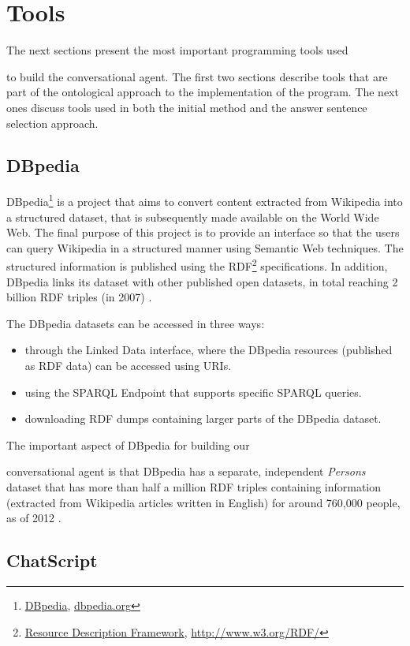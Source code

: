 \chapter{Tools}
\label{chapter:tools}

The next sections present the most important programming tools used  to build the conversational agent. The first two sections describe tools that are part of the ontological approach to the implementation of the program. The next ones discuss tools used in both the initial method and the answer sentence selection approach.

\section[DBpedia]{DBpedia}
\label{sec:dbpedia}

DBpedia\footnote{\href{dbpedia.org}{DBpedia}, \url{dbpedia.org}} is a project that aims to convert content extracted from Wikipedia into a structured dataset, that is subsequently made available on the World Wide Web. The final purpose of this project is to provide an interface so that the users can query Wikipedia in a structured manner using Semantic Web techniques. The structured information is published using the RDF\footnote{\href{http://www.w3.org/RDF/}{Resource Description Framework}, \url{http://www.w3.org/RDF/}} specifications. In addition, DBpedia links its dataset with other published open datasets, in total reaching 2 billion RDF triples (in 2007) \cite{Auer2007}.

The DBpedia datasets can be accessed in three ways:
\begin{itemize}
  \item through the Linked Data interface, where the DBpedia resources (published as RDF data) can be accessed using URIs.
  \item using the SPARQL Endpoint that supports specific SPARQL queries.
  \item downloading RDF dumps containing larger parts of the DBpedia dataset.
\end{itemize}

The important aspect of DBpedia for building our  conversational agent is that DBpedia has a separate, independent {\em Persons} dataset that has more than half a million RDF triples containing information (extracted from Wikipedia articles written in English) for around 760,000 people, as of 2012 \cite{Lehmann2012}.

\section[ChatScript]{ChatScript}
\label{sec:chatscript}

